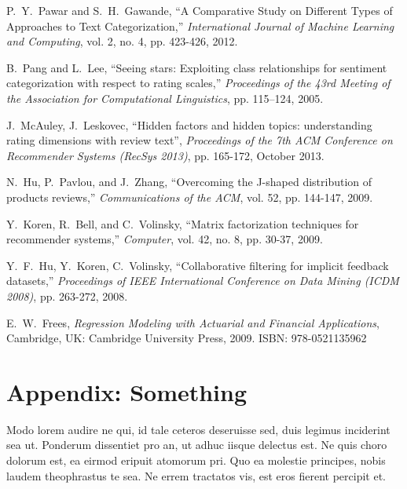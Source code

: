 \documentclass[a4paper,twoside]{article}
\begin{document}
\begin{spacing}{1.2}
	\newpage
	\begin{thebibliography}{00}
		
		
		P.~Y.~Pawar and S.~H.~Gawande, ``A Comparative Study on Different Types of Approaches to Text Categorization,'' \textit{International Journal of Machine Learning and Computing}, vol. 2, no. 4, pp. 423-426, 2012.
		
		B.~Pang and L.~Lee, ``Seeing stars: Exploiting class relationships for sentiment categorization with respect to rating scales,'' \textit{Proceedings of the 43rd Meeting of the Association for Computational Linguistics}, pp. 115–124, 2005.
		
		J.~McAuley, J.~Leskovec, ``Hidden factors and hidden topics: understanding rating dimensions with review text'', \textit{Proceedings of the 7th ACM Conference on Recommender Systems (RecSys 2013)}, pp. 165-172, October 2013.
		
		N.~Hu, P.~Pavlou, and J.~Zhang, ``Overcoming the J-shaped distribution of products reviews,'' \textit{Communications of the ACM}, vol. 52, pp. 144-147, 2009. 
		
		Y.~Koren, R.~Bell, and C.~Volinsky, ``Matrix factorization techniques for recommender systems,'' \textit{Computer}, vol. 42, no. 8, pp. 30-37, 2009.
		
		Y.~F.~Hu, Y.~Koren, C.~Volinsky, ``Collaborative filtering for implicit feedback datasets,'' \textit{Proceedings of IEEE International Conference on Data Mining (ICDM 2008)}, pp. 263-272, 2008.
		
		E.~W.~Frees, \textit{Regression Modeling with Actuarial and Financial Applications}, Cambridge, UK: Cambridge University Press, 2009. ISBN: 978-0521135962
		
	\end{thebibliography}
	
	
	\addtocounter{page}{-1}
	\thispagestyle{empty}
	
	
	\newpage
	\appendix
	\section*{Appendix: Something}
	Modo lorem audire ne qui, id tale ceteros deseruisse sed, duis legimus inciderint sea ut. Ponderum dissentiet pro an, ut adhuc iisque delectus est. Ne quis choro dolorum est, ea eirmod eripuit atomorum pri. Quo ea molestie principes, nobis laudem theophrastus te sea. Ne errem tractatos vis, est eros fierent percipit et.
	
	\addtocounter{page}{-1}
	\thispagestyle{empty}
	
	\end{spacing}
\end{document}
